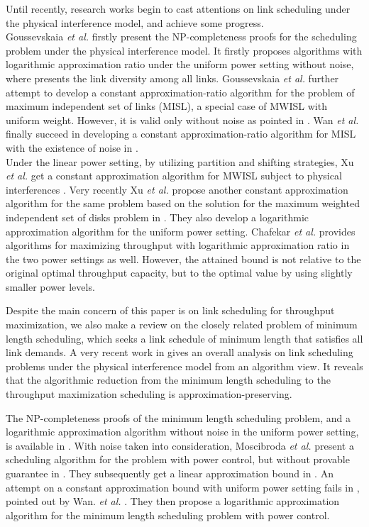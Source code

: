 \documentclass[journal]{IEEEtran}
\begin{document}
\indent Until recently, research works begin to cast attentions on link scheduling under the physical interference model, and achieve some progress.\\
\indent Goussevskaia \emph{et al.} \cite{S:phy1} firstly  present the NP-completeness proofs for the scheduling problem  under the physical interference model. It firstly proposes algorithms with logarithmic  approximation ratio  under the uniform power setting without noise, where    presents the link diversity among all links.  Goussevskaia \emph{et al.} further \cite{S:phy2} attempt to develop a constant approximation-ratio algorithm for the problem  of maximum independent set of links (MISL), a special case of MWISL with uniform weight. However, it is valid only without noise as pointed in \cite{S:phy3}. Wan \emph{et al.} finally succeed in developing a constant approximation-ratio algorithm for MISL with the existence of noise in  \cite{S:phy4}.\\
\indent Under the linear power setting, by utilizing partition and shifting strategies, Xu \emph{et al.}  get a constant approximation algorithm for MWISL subject to physical interferences \cite{S:phy5}. Very recently Xu \emph{et al.} \cite{S:phy9} propose another  constant approximation algorithm for the same problem based on the solution for the maximum weighted independent set of disks problem in \cite{S:ptas}. They also develop a logarithmic approximation algorithm for the uniform power setting. Chafekar \emph{et al.}  \cite{S:phy12} provides  algorithms for maximizing throughput with logarithmic approximation ratio  in the two power settings as well. However, the attained bound is not relative to the original optimal throughput capacity, but to the optimal value by using slightly smaller power levels.

Despite the main concern of this paper is on link scheduling for throughput maximization, we also make a review on the closely related problem of minimum length scheduling, which seeks a link schedule of  minimum length that satisfies all link demands. A very recent work in \cite{S:phy6} gives an overall analysis on link scheduling problems under the physical interference model  from an algorithm view. It reveals that the algorithmic reduction from the minimum length scheduling to the throughput maximization scheduling is approximation-preserving.

The NP-completeness proofs of the  minimum length scheduling problem, and a logarithmic approximation algorithm without noise in the uniform power setting, is  available in \cite{S:phy1}. With noise taken into consideration, Moscibroda \emph{et al.} present a scheduling algorithm for the problem with power control, but without provable guarantee in \cite{S:phy13}. They subsequently get a linear approximation bound in \cite{S:phy14}. An attempt on a constant approximation bound with uniform power setting fails in \cite{S:phy8}, pointed out by Wan. \emph{et al.} \cite{S:phy15}. They \cite{S:phy15} then propose a logarithmic approximation algorithm for the minimum length scheduling problem with power control.
\end{document}

